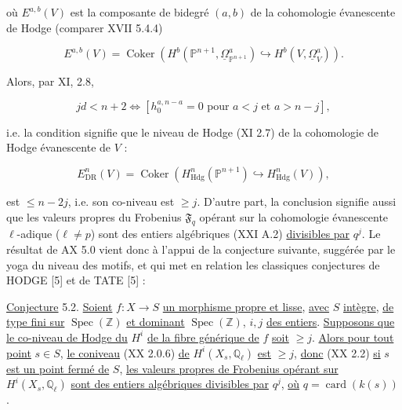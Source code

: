 où $E^{a,b}(V)$ est la composante de bidegré $(a,b)$ de la \og cohomologie
évanescente de Hodge\fg{} (comparer XVII 5.4.4)

\begin{equation}\tag{5.1.3}
E^{a,b}(V)
=\operatorname{Coker}\!\left(
H^b(\mathbb P^{n+1},\underline{\Omega}_{\mathbb P^{n+1}}^a)
\hookrightarrow H^b(V,\underline{\Omega}_V^a)\right).
\end{equation}

Alors, par XI, 2.8,

\begin{equation}\tag{5.1.4}
jd<n+2
\Longleftrightarrow
\left[h_0^{a,n-a}=0\text{ pour }a<j\text{ et }a>n-j\right],
\end{equation}

i.e. la condition signifie que le \og niveau de Hodge\fg{} (XI 2.7) de la
\og cohomologie de Hodge évanescente\fg{} de $V$ :

\begin{equation*}
E_{\mathrm{DR}}^n(V)
=\operatorname{Coker}\!\left(
H_{\mathrm{Hdg}}^n(\mathbb P^{n+1})
\hookrightarrow H_{\mathrm{Hdg}}^n(V)\right),
\end{equation*}


est $\leq n-2j$, i.e. son co-niveau est $\geq j$. D'autre part, la
conclusion signifie aussi que les valeurs propres du Frobenius
$\mathfrak F_q$ opérant sur la cohomologie évanescente $\ell$-adique
($\ell\ne p$) sont des entiers algébriques (XXI A.2) \underline{divisibles par} $q^j$.
Le résultat de AX 5.0 vient donc à l'appui de la conjecture suivante,
suggérée par le yoga du niveau des motifs, et qui met en relation les
classiques conjectures de HODGE [5] et de TATE [5] :

\underline{Conjecture} 5.2.
\underline{Soient} $f:X\to S$ \underline{un morphisme propre et lisse}, \underline{avec} $S$ \underline{intègre}, \underline{de type
fini sur} $\operatorname{Spec}(\mathbb Z)$ \underline{et dominant}
$\operatorname{Spec}(\mathbb Z)$, $i,j$ \underline{des entiers}. \underline{Supposons que le
co-niveau de Hodge du} $H^i$ \underline{de la fibre générique de} $f$ \underline{soit} $\geq j$.
\underline{Alors pour tout point} $s\in S$, \underline{le coniveau} (XX 2.0.6) \underline{de}
$H^i(X_s,\mathbb Q_\ell)$ \underline{est} $\geq j$, \underline{donc} (XX 2.2) \underline{si} $s$ \underline{est un point
fermé de} $S$, \underline{les valeurs propres de Frobenius opérant sur}
$H^i(X_s,\mathbb Q_\ell)$ \underline{sont des entiers algébriques divisibles par}
$q^j$, \underline{où} $q=\operatorname{card}(k(s))$.

